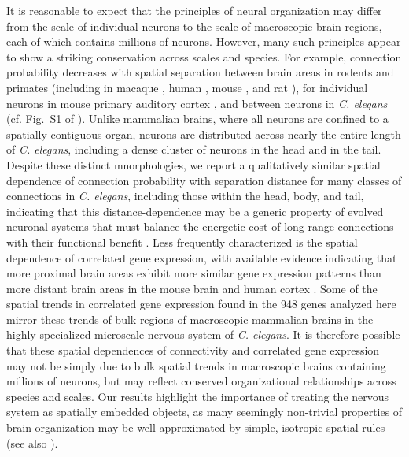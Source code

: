 \documentclass[10pt,letterpaper]{article}
\begin{document}
{It is reasonable to expect that the principles of neural organization may differ from the scale of individual neurons to the scale of macroscopic brain regions, each of which contains millions of neurons.
However, many such principles appear to show a striking conservation across scales and species.
For example, connection probability decreases with spatial separation between brain areas in rodents and primates \cite{Horvat:2016ia, Wang:2016gg} (including in macaque \cite{Markov:2013jo}, human \cite{Henderson:2014fg}, mouse \cite{Fulcher:2016ck}, and rat \cite{Noori:2017ce}), for individual neurons in mouse primary auditory cortex \cite{Levy:2012dy}, and between neurons in \emph{C. elegans} (cf. Fig.~S1 of \cite{Azulay:2016cg}).
Unlike mammalian brains, where all neurons are confined to a spatially contiguous organ, neurons are distributed across nearly the entire length of \emph{C. elegans}, including a dense cluster of neurons in the head and in the tail.
Despite these distinct mnorphologies, we report a qualitatively similar spatial dependence of connection probability with separation distance for many classes of connections in \emph{C. elegans}, including those within the head, body, and tail, indicating that this distance-dependence may be a generic property of evolved neuronal systems that must balance the energetic cost of long-range connections with their functional benefit \cite{Bullmore:2012vl, vandenHeuvel:2012kh, Kim:2014bu, Betzel:2016jt}.
Less frequently characterized is the spatial dependence of correlated gene expression, with available evidence indicating that more proximal brain areas exhibit more similar gene expression patterns than more distant brain areas in the mouse brain \cite{Fulcher:2016ck} and human cortex \cite{Krienen:2016eq, Pantazatos:2016ir, Richiardi:2017hb}.
Some of the spatial trends in correlated gene expression found in the 948 genes analyzed here mirror these trends of bulk regions of macroscopic mammalian brains in the highly specialized microscale nervous system of \emph{C. elegans}.
It is therefore possible that these spatial dependences of connectivity and correlated gene expression may not be simply due to bulk spatial trends in macroscopic brains containing millions of neurons, but may reflect conserved organizational relationships across species and scales.
Our results highlight the importance of treating the nervous system as spatially embedded objects, as many seemingly non-trivial properties of brain organization may be well approximated by simple, isotropic spatial rules \cite{Henderson:2014fg, Roberts2016, Horvat:2016ia, Bassett:2010hf, Chen:2006ie} (see also \cite{Bullmore:2012vl, Betzel:2016jt}).


}
\end{document}
